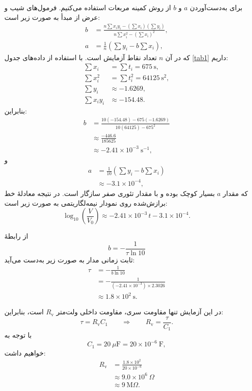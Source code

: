 \documentclass[a4paper, 11pt]{article}
\begin{document}
برای به‌دست‌آوردن \(a\) و \(b\) از روش کمینه مربعات استفاده می‌کنیم. فرمول‌های شیب و عرض از مبدأ به صورت زیر است:
\begin{align}
b &=
\frac{n\sum x_i y_i - \left(\sum x_i\right)\left(\sum y_i\right)}
     {n\sum x_i^2 - \left(\sum x_i\right)^2},\\[2mm]
a &= \frac{1}{n}\left(\sum y_i - b\sum x_i\right),
\end{align}
که در آن \(n\) تعداد نقاط آزمایش است. با استفاده از داده‌های جدول \ref{tab1} داریم:
\begin{align}
\sum x_i &= \sum t_i = 675~\mathrm{s},\\
\sum x_i^2 &= \sum t_i^2 = 64125~\mathrm{s^2},\\
\sum y_i &\approx -1.6269,\\
\sum x_i y_i &\approx -154.48.
\end{align}
بنابراین:
\begin{align}
b &=
\frac{10(-154.48) - 675(-1.6269)}
     {10(64125) - 675^2} \\
&\approx \frac{-446.6}{185625} \\
&\approx -2.41\times10^{-3}\ \mathrm{s^{-1}},
\end{align}
و
\begin{align}
a &= \frac{1}{10}\left(\sum y_i - b\sum x_i\right) \\
&\approx -3.1\times10^{-4},
\end{align}
که مقدار \(a\) بسیار کوچک بوده و با مقدار تئوری صفر سازگار است. در نتیجه معادلهٔ خط برازش‌شده روی نمودار نیمه‌لگاریتمی به صورت زیر است:
\begin{equation}
\log_{10}\!\left(\frac{V}{V_0}\right)
  \approx -2.41\times10^{-3}\, t - 3.1\times10^{-4}.
\end{equation}

از رابطهٔ
\begin{equation}
b = -\frac{1}{\tau \ln 10}
\end{equation}
ثابت زمانی مدار به صورت زیر به‌دست می‌آید:
\begin{align}
\tau &= -\frac{1}{b\ln 10} \\
&= -\frac{1}{(-2.41\times10^{-3})\times 2.3026} \\
&\approx 1.8\times10^{2}\ \mathrm{s}.
\end{align}

در این آزمایش تنها مقاومت سری، مقاومت داخلی ولت‌متر \(R_\mathrm{v}\) است، بنابراین:
\begin{equation}
\tau = R_\mathrm{v} C_1
\qquad\Rightarrow\qquad
R_\mathrm{v} = \frac{\tau}{C_1}.
\end{equation}
با توجه به
\[
C_1 = 20~\mu\mathrm{F} = 20\times10^{-6}~\mathrm{F},
\]
خواهیم داشت:
\begin{align}
R_\mathrm{v}
&= \frac{1.8\times10^{2}}{20\times10^{-6}} \\
&\approx 9.0\times10^{6}\ \Omega \\
&\approx 9~\mathrm{M}\Omega.
\end{align}
\end{document}

